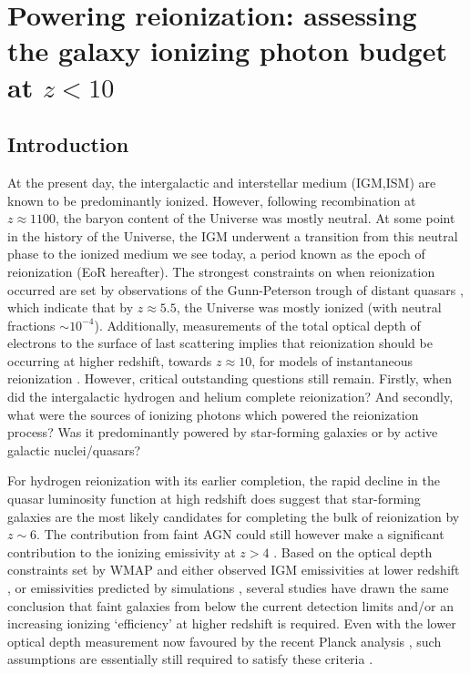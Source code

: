 \chapter[Powering reionization]{Powering reionization: assessing the galaxy ionizing photon budget at $z < 10$}\label{ch:reionization}


\section{Introduction}
At the present day, the intergalactic and interstellar medium (IGM,ISM) are known to be predominantly ionized. However, following recombination at $z\approx1100$, the baryon content of the Universe was mostly neutral. At some point in the history of the Universe, the IGM underwent a transition from this neutral phase to the ionized medium we see today, a period known as the epoch of reionization (EoR hereafter). The strongest constraints on when reionization occurred are set by observations of the Gunn-Peterson trough of distant quasars \citep{2006ARA&A..44..415F}, which indicate that by $z\approx 5.5$, the Universe was mostly ionized (with neutral fractions $\sim 10^{-4}$). Additionally, measurements of the total optical depth of electrons to the surface of last scattering implies that reionization should be occurring at higher redshift, towards $z \approx 10$, for models of instantaneous reionization \citep{Hinshaw:2013dd,Bennett:2013ew}. However, critical outstanding questions still remain. Firstly, when did the intergalactic hydrogen and helium complete reionization? And secondly, what were the sources of ionizing photons which powered the reionization process? Was it predominantly powered by star-forming galaxies or by active galactic nuclei/quasars?

For hydrogen reionization with its earlier completion, the rapid decline in the quasar luminosity function at high redshift \citep{Willott:2010bk,Fontanot:2012fx,Fontanot:2014jz} does suggest that star-forming galaxies are the most likely candidates for completing the bulk of reionization by $z\sim6$. The contribution from faint AGN could still however make a significant contribution to the ionizing emissivity at $z>4$ \citep{Giallongo:2015to}. Based on the optical depth constraints set by WMAP \citep{Hinshaw:2013dd} and either observed IGM emissivities at lower redshift \citep{Kuhlen:2012ka,Robertson:2013ji,Becker:2013hc}, or emissivities predicted by simulations \citep{Ciardi:2012hl}, several studies have drawn the same conclusion that faint galaxies from below the current detection limits and/or an increasing ionizing `efficiency' at higher redshift is required. Even with the lower optical depth measurement now favoured by the recent Planck analysis \citep{Collaboration:2015tp}, such assumptions are essentially still required to satisfy these criteria \citep{Robertson:2015wk}.

